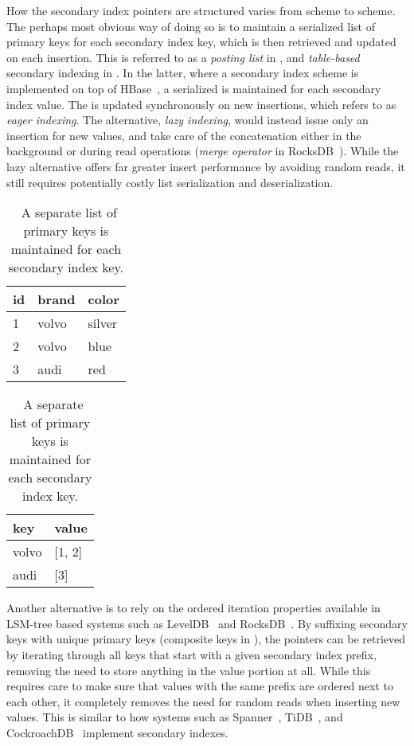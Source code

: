 How the secondary index pointers are structured varies from scheme to scheme.
The perhaps most obvious way of doing so is to maintain a serialized list of
primary keys for each secondary index key, which is then retrieved and updated
on each insertion. This is referred to as a \textit{posting list} in
\cite{lsm-comparison}, and \textit{table-based} secondary indexing in
\cite{hbase-secondary}. In the latter, where a secondary index scheme is
implemented on top of HBase~\cite{hbase}, a serialized  is
maintained for each secondary index value. The  is updated
synchronously on new insertions, which \cite{lsm-comparison} refers to as
\textit{eager indexing}. The alternative, \textit{lazy indexing}, would instead
issue only an insertion for new values, and take care of the concatenation
either in the background or during read operations (\textit{merge operator} in
RocksDB~\cite{rocksdb-merge}). While the lazy alternative offers far greater
insert performance by avoiding random reads, it still requires potentially
costly list serialization and deserialization.

\begin{table}[H]
  \centering
  \begin{tabular}{l l l}
    \toprule
    \textbf{id} & \textbf{brand} & \textbf{color} \\ \midrule
    1 & volvo & silver \\ \midrule
    2 & volvo & blue \\ \midrule
    3 & audi & red \\ \bottomrule
  \end{tabular}
  \quad
  \begin{tabular}{l l}
    \toprule
    \textbf{key} & \textbf{value} \\ \midrule
    volvo & [1, 2] \\ \midrule
    audi & [3] \\ \bottomrule
  \end{tabular}

  \caption{\
    A separate list of primary keys is maintained for each secondary index key.
  }\label{table:secondary-list}
\end{table}

Another alternative is to rely on the ordered iteration properties available in
LSM-tree based systems such as LevelDB~\cite{leveldb-iteration} and
RocksDB~\cite{rocksdb-iteration}. By suffixing secondary keys with unique
primary keys (composite keys in \cite{lsm-comparison}), the pointers can be
retrieved by iterating through all keys that start with a given secondary index
prefix, removing the need to store anything in the value portion at all. While
this requires care to make sure that values with the same prefix are ordered
next to each other, it completely removes the need for random reads when
inserting new values. This is similar to how systems such as
Spanner~\cite{spanner-sql}, TiDB~\cite{tidb-internal}, and
CockroachDB~\cite{cockroach-design} implement secondary indexes.

